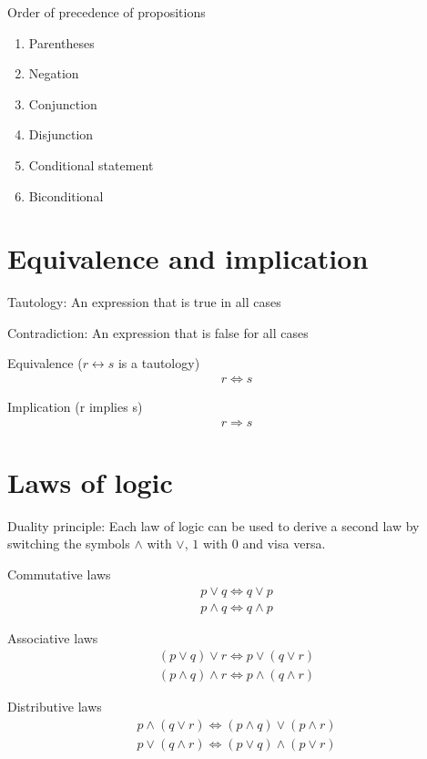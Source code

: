 \documentclass{article}
\begin{document}
Order of precedence of propositions
\begin{enumerate}
    \item Parentheses
    \item Negation
    \item Conjunction
    \item Disjunction
    \item Conditional statement
    \item Biconditional
\end{enumerate}

\section{Equivalence and implication}

Tautology: An expression that is true in all cases

Contradiction: An expression that is false for all cases

Equivalence ($r \leftrightarrow s$ is a tautology)
\begin{gather*}
    r \Leftrightarrow s
\end{gather*}

Implication (r implies s)
\begin{gather*}
    r \Rightarrow s
\end{gather*}

\section{Laws of logic}

Duality principle: Each law of logic can be used to derive a second law by switching the symbols $\land$ with $\lor$, $1$ with $0$ and visa versa.

Commutative laws
\begin{gather*}
    p \lor q \Leftrightarrow q \lor p \\
    p \land q \Leftrightarrow q \land p
\end{gather*}

Associative laws
\begin{gather*}
    (p \lor q) \lor r \Leftrightarrow p \lor (q \lor r) \\
    (p \land q) \land r \Leftrightarrow p \land (q \land r)
\end{gather*}

Distributive laws
\begin{gather*}
    p \land (q \lor r) \Leftrightarrow (p \land q) \lor (p \land r) \\
    p \lor (q \land r) \Leftrightarrow (p \lor q) \land (p \lor r) \\
\end{gather*}
\end{document}
